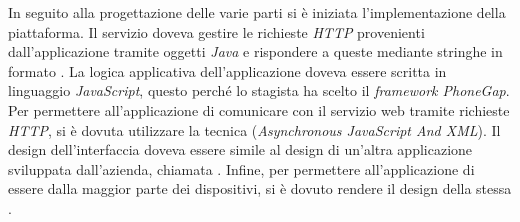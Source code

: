 In seguito alla progettazione delle varie parti si è iniziata l'implementazione della piattaforma. Il servizio doveva gestire le richieste \textit{HTTP} provenienti dall'applicazione tramite oggetti  \textit{Java} e rispondere a queste mediante stringhe in formato .
La logica applicativa dell'applicazione doveva essere scritta in linguaggio \textit{JavaScript}, questo perché lo stagista ha scelto il \textit{framework PhoneGap}. Per permettere all'applicazione di comunicare con il servizio web tramite richieste \textit{HTTP}, si è dovuta utilizzare la tecnica  (\textit{Asynchronous JavaScript And XML}).
Il design dell'interfaccia doveva essere simile al design di un'altra applicazione sviluppata dall'azienda, chiamata . Infine, per permettere all'applicazione di essere  dalla maggior parte dei dispositivi, si è dovuto rendere il design della stessa .

%
%

\endgroup			

\vfill

